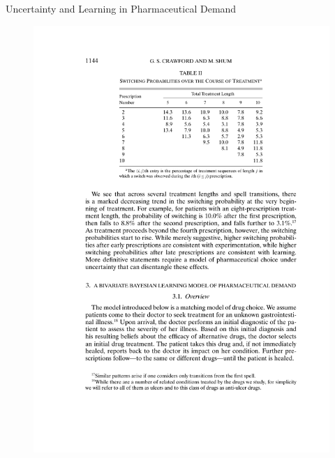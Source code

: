 \documentclass[xcolor=pdftex,dvipsnames,table,mathserif]{beamer}
\begin{document}
\begin{frame}{Uncertainty and Learning in Pharmaceutical Demand}
\begin{figure}[htbp]
\begin{center}
\includegraphics{resources/crawfordshum1.pdf}
\label{default}
\end{center}
\end{figure}
\end{frame}
\end{document}
